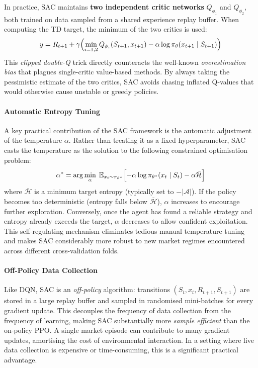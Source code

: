             In practice, SAC maintains \textbf{two independent critic networks} $Q_{\phi_1}$ and $Q_{\phi_2}$, both trained on data sampled from a shared experience replay buffer. When computing the TD target, the minimum of the two critics is used:
            \[
                y = R_{t+1} + \gamma \Bigl( \min_{i=1,2} Q_{\phi_i}(S_{t+1}, x_{t+1}) - \alpha \log \pi_\theta(x_{t+1} \mid S_{t+1}) \Bigr)
            \]
            This \textit{clipped double-Q} trick directly counteracts the well-known \textit{overestimation bias} that plagues single-critic value-based methods. By always taking the pessimistic estimate of the two critics, SAC avoids chasing inflated Q-values that would otherwise cause unstable or greedy policies.

            \paragraph{Automatic Entropy Tuning}
            A key practical contribution of the SAC framework is the automatic adjustment of the temperature $\alpha$. Rather than treating it as a fixed hyperparameter, SAC casts the temperature as the solution to the following constrained optimisation problem:
            \[
                \alpha^* = \arg\min_\alpha\; \mathbb{E}_{x_t \sim \pi_{\theta^*}} \Bigl[ -\alpha \log \pi_{\theta^*}(x_t \mid S_t) - \alpha \bar{\mathcal{H}} \Bigr]
            \]
            where $\bar{\mathcal{H}}$ is a minimum target entropy (typically set to $-|\mathcal{A}|$). If the policy becomes too deterministic (entropy falls below $\bar{\mathcal{H}}$), $\alpha$ increases to encourage further exploration. Conversely, once the agent has found a reliable strategy and entropy already exceeds the target, $\alpha$ decreases to allow confident exploitation. This self-regulating mechanism eliminates tedious manual temperature tuning and makes SAC considerably more robust to new market regimes encountered across different cross-validation folds.

            \paragraph{Off-Policy Data Collection}
            Like DQN, SAC is an \textit{off-policy} algorithm: transitions $(S_t, x_t, R_{t+1}, S_{t+1})$ are stored in a large replay buffer and sampled in randomised mini-batches for every gradient update. This decouples the frequency of data collection from the frequency of learning, making SAC substantially more \textit{sample efficient} than the on-policy PPO. A single market episode can contribute to many gradient updates, amortising the cost of environmental interaction. In a setting where live data collection is expensive or time-consuming, this is a significant practical advantage.


